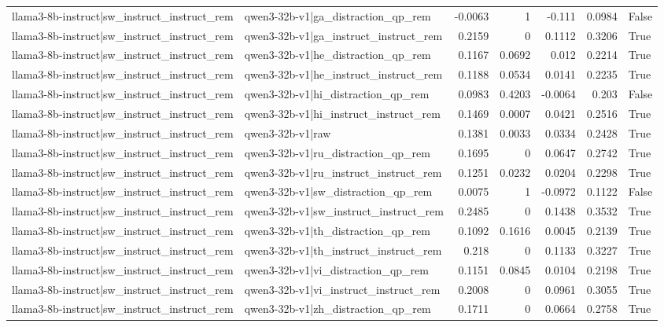 \begin{table}
\begin{tabular}{l l r r r r l}
llama3-8b-instruct|sw_instruct_instruct_rem & qwen3-32b-v1|ga_distraction_qp_rem & -0.0063 & 1 & -0.111 & 0.0984 & False \\
llama3-8b-instruct|sw_instruct_instruct_rem & qwen3-32b-v1|ga_instruct_instruct_rem & 0.2159 & 0 & 0.1112 & 0.3206 & True \\
llama3-8b-instruct|sw_instruct_instruct_rem & qwen3-32b-v1|he_distraction_qp_rem & 0.1167 & 0.0692 & 0.012 & 0.2214 & True \\
llama3-8b-instruct|sw_instruct_instruct_rem & qwen3-32b-v1|he_instruct_instruct_rem & 0.1188 & 0.0534 & 0.0141 & 0.2235 & True \\
llama3-8b-instruct|sw_instruct_instruct_rem & qwen3-32b-v1|hi_distraction_qp_rem & 0.0983 & 0.4203 & -0.0064 & 0.203 & False \\
llama3-8b-instruct|sw_instruct_instruct_rem & qwen3-32b-v1|hi_instruct_instruct_rem & 0.1469 & 0.0007 & 0.0421 & 0.2516 & True \\
llama3-8b-instruct|sw_instruct_instruct_rem & qwen3-32b-v1|raw & 0.1381 & 0.0033 & 0.0334 & 0.2428 & True \\
llama3-8b-instruct|sw_instruct_instruct_rem & qwen3-32b-v1|ru_distraction_qp_rem & 0.1695 & 0 & 0.0647 & 0.2742 & True \\
llama3-8b-instruct|sw_instruct_instruct_rem & qwen3-32b-v1|ru_instruct_instruct_rem & 0.1251 & 0.0232 & 0.0204 & 0.2298 & True \\
llama3-8b-instruct|sw_instruct_instruct_rem & qwen3-32b-v1|sw_distraction_qp_rem & 0.0075 & 1 & -0.0972 & 0.1122 & False \\
llama3-8b-instruct|sw_instruct_instruct_rem & qwen3-32b-v1|sw_instruct_instruct_rem & 0.2485 & 0 & 0.1438 & 0.3532 & True \\
llama3-8b-instruct|sw_instruct_instruct_rem & qwen3-32b-v1|th_distraction_qp_rem & 0.1092 & 0.1616 & 0.0045 & 0.2139 & True \\
llama3-8b-instruct|sw_instruct_instruct_rem & qwen3-32b-v1|th_instruct_instruct_rem & 0.218 & 0 & 0.1133 & 0.3227 & True \\
llama3-8b-instruct|sw_instruct_instruct_rem & qwen3-32b-v1|vi_distraction_qp_rem & 0.1151 & 0.0845 & 0.0104 & 0.2198 & True \\
llama3-8b-instruct|sw_instruct_instruct_rem & qwen3-32b-v1|vi_instruct_instruct_rem & 0.2008 & 0 & 0.0961 & 0.3055 & True \\
llama3-8b-instruct|sw_instruct_instruct_rem & qwen3-32b-v1|zh_distraction_qp_rem & 0.1711 & 0 & 0.0664 & 0.2758 & True \\

\end{tabular}
\end{table}
